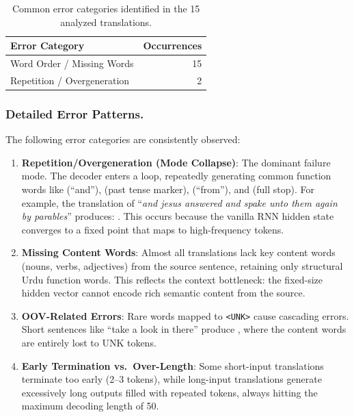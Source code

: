 \documentclass[runningheads]{llncs}
\begin{document}
\begin{table}[H]
\centering
\caption{Common error categories identified in the 15 analyzed translations.}
\label{tab:errors}
\begin{tabular}{@{}lr@{}}
\toprule
\textbf{Error Category} & \textbf{Occurrences} \\
\midrule
Word Order / Missing Words    & 15 \\
Repetition / Overgeneration   & 2 \\
\bottomrule
\end{tabular}
\end{table}

\subsubsection{Detailed Error Patterns.}
The following error categories are consistently observed:

\begin{enumerate}
    \item \textbf{Repetition/Overgeneration (Mode Collapse)}: The dominant failure mode. The decoder enters a loop, repeatedly generating common function words like  (``and''),  (past tense marker),  (``from''), and  (full stop). For example, the translation of ``\textit{and jesus answered and spake unto them again by parables}'' produces: . This occurs because the vanilla RNN hidden state converges to a fixed point that maps to high-frequency tokens.
    
    \item \textbf{Missing Content Words}: Almost all translations lack key content words (nouns, verbs, adjectives) from the source sentence, retaining only structural Urdu function words. This reflects the context bottleneck: the fixed-size hidden vector cannot encode rich semantic content from the source.
    
    \item \textbf{OOV-Related Errors}: Rare words mapped to \texttt{<UNK>} cause cascading errors. Short sentences like ``take a look in there'' produce , where the content words are entirely lost to UNK tokens.
    
    \item \textbf{Early Termination vs.\ Over-Length}: Some short-input translations terminate too early (2--3 tokens), while long-input translations generate excessively long outputs filled with repeated tokens, always hitting the maximum decoding length of 50.
\end{enumerate}
\end{document}

